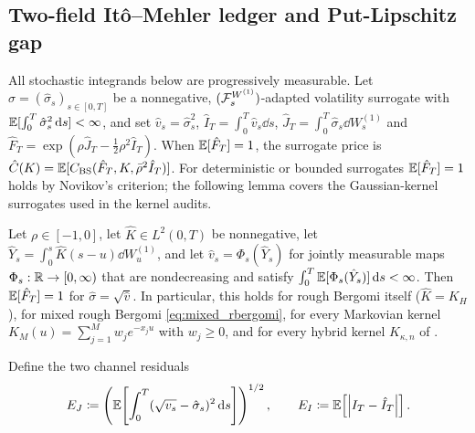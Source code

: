 \subsection{Two-field It\^o--Mehler ledger and Put-Lipschitz gap}
\label{sec:theorems}

All stochastic integrands below are progressively measurable. Let $\hat{\sigma}=(\hat{\sigma}_s)_{s\in[0,T]}$ be a nonnegative, $(\mathcal{F}_s^{W^{(1)}})$-adapted volatility surrogate with $\mathbb{E}[\int_0^T \hat{\sigma}_s^2\,\mathrm{d} s]<\infty$, and set $\hat{v}_s=\hat{\sigma}_s^2$, $\hat{I}_T=\int_0^T\hat{v}_s\dd s$, $\hat{J}_T=\int_0^T\hat{\sigma}_s\dd W_s^{(1)}$ and $\hat{F}_T=\exp(\rho\hat{J}_T - \tfrac12\rho^2\hat{I}_T)$. When $\mathbb{E}[\hat{F}_T]=1$, the surrogate price is $\hat{C}(K)=\mathbb{E}[C_{\mathrm{BS}}(\hat{F}_T,K,\bar{\rho}^2\hat{I}_T)]$. For deterministic or bounded surrogates $\mathbb{E}[\hat{F}_T]=1$ holds by Novikov's criterion; the following lemma covers the Gaussian-kernel surrogates used in the kernel audits.

\begin{lemma}
\label{lem:surrogate_mart}
Let $\rho\in[-1,0]$, let $\hat{K}\in L^2(0,T)$ be nonnegative, let $\hat{Y}_s=\int_0^s\hat{K}(s-u)\dd W_u^{(1)}$, and let $\hat{v}_s=\Phi_s(\hat{Y}_s)$ for jointly measurable maps $\Phi_s:\mathbb{R}\to[0,\infty)$ that are nondecreasing and satisfy $\int_0^T\mathbb{E}[\Phi_s(\hat{Y}_s)]\,\mathrm{d} s<\infty$. Then $\mathbb{E}[\hat{F}_T]=1$ for $\hat{\sigma}=\sqrt{\hat{v}}$. In particular, this holds for rough Bergomi itself ($\hat{K}=K_H$), for mixed rough Bergomi \eqref{eq:mixed_rbergomi}, for every Markovian kernel $K_M(u)=\sum_{j=1}^M w_je^{-x_ju}$ with $w_j\ge0$, and for every hybrid kernel $K_{\kappa,n}$ of \citet{BennedsenLundePakkanen2017}.
\end{lemma}

Define the two channel residuals
\begin{equation}
  \begin{gathered}
  E_J \coloneqq \left(\mathbb{E}\!\left[\int_0^T (\sqrt{v_s}-\hat{\sigma}_s)^2\,\mathrm{d} s\right]\right)^{1/2},
  \qquad
  E_I \coloneqq \mathbb{E}\!\left[\left|I_T-\hat{I}_T\right|\right].
  \end{gathered}
  \label{eq:channel_residuals}
\end{equation}

